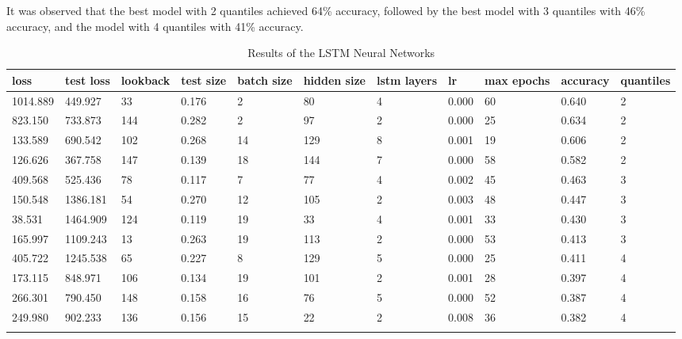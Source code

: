 \documentclass[sn-mathphys-num]{sn-jnl}
\begin{document}
It was observed that the best model with 2 quantiles achieved 64\% accuracy, followed by the best model with 3 quantiles with 46\% accuracy, and the model with 4 quantiles with 41\% accuracy.

\begin{table}
    \caption{Results of the LSTM Neural Networks}\label{tab2}
    \begin{tabular}{@{}lllllllllll@{}}
        \toprule%
        loss     & test loss & lookback & test size & batch size & hidden size & lstm layers & lr    & max epochs & accuracy & quantiles \\
        \midrule
        1014.889 & 449.927   & 33       & 0.176     & 2          & 80          & 4           & 0.000 & 60         & 0.640    & 2         \\
        823.150  & 733.873   & 144      & 0.282     & 2          & 97          & 2           & 0.000 & 25         & 0.634    & 2         \\
        133.589  & 690.542   & 102      & 0.268     & 14         & 129         & 8           & 0.001 & 19         & 0.606    & 2         \\
        126.626  & 367.758   & 147      & 0.139     & 18         & 144         & 7           & 0.000 & 58         & 0.582    & 2         \\
        \midrule
        409.568  & 525.436   & 78       & 0.117     & 7          & 77          & 4           & 0.002 & 45         & 0.463    & 3         \\
        150.548  & 1386.181  & 54       & 0.270     & 12         & 105         & 2           & 0.003 & 48         & 0.447    & 3         \\
        38.531   & 1464.909  & 124      & 0.119     & 19         & 33          & 4           & 0.001 & 33         & 0.430    & 3         \\
        165.997  & 1109.243  & 13       & 0.263     & 19         & 113         & 2           & 0.000 & 53         & 0.413    & 3         \\
        \midrule
        405.722  & 1245.538  & 65       & 0.227     & 8          & 129         & 5           & 0.000 & 25         & 0.411    & 4         \\
        173.115  & 848.971   & 106      & 0.134     & 19         & 101         & 2           & 0.001 & 28         & 0.397    & 4         \\
        266.301  & 790.450   & 148      & 0.158     & 16         & 76          & 5           & 0.000 & 52         & 0.387    & 4         \\
        249.980  & 902.233   & 136      & 0.156     & 15         & 22          & 2           & 0.008 & 36         & 0.382    & 4         \\
        \botrule
    \end{tabular}
\end{table}
\unskip
\end{document}
